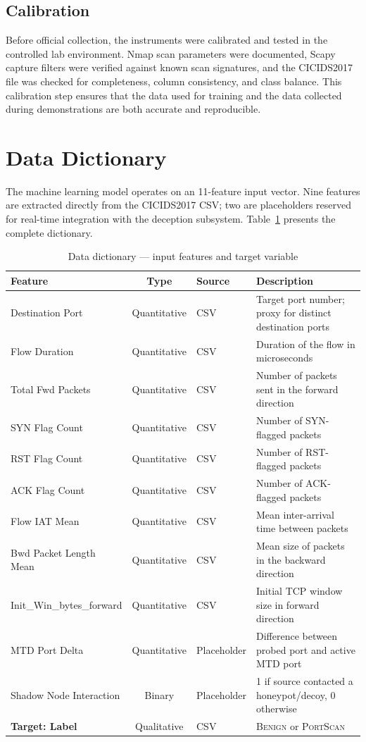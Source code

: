 \subsection{Calibration}

Before official collection, the instruments were calibrated and tested in the controlled lab environment. Nmap scan parameters were documented, Scapy capture filters were verified against known scan signatures, and the CICIDS2017 file was checked for completeness, column consistency, and class balance. This calibration step ensures that the data used for training and the data collected during demonstrations are both accurate and reproducible.

\section{Data Dictionary}\label{sec:data_dictionary}

The machine learning model operates on an 11-feature input vector. Nine features are extracted directly from the CICIDS2017 CSV; two are placeholders reserved for real-time integration with the deception subsystem. Table~\ref{tab:data_dict} presents the complete dictionary.

\begin{table}[H]
\centering
\caption{Data dictionary --- input features and target variable}
\label{tab:data_dict}
\begin{tabularx}{\textwidth}{lclX}
\toprule
\textbf{Feature} & \textbf{Type} & \textbf{Source} & \textbf{Description} \\
\midrule
Destination Port & Quantitative & CSV & Target port number; proxy for distinct destination ports \\
Flow Duration & Quantitative & CSV & Duration of the flow in microseconds \\
Total Fwd Packets & Quantitative & CSV & Number of packets sent in the forward direction \\
SYN Flag Count & Quantitative & CSV & Number of SYN-flagged packets \\
RST Flag Count & Quantitative & CSV & Number of RST-flagged packets \\
ACK Flag Count & Quantitative & CSV & Number of ACK-flagged packets \\
Flow IAT Mean & Quantitative & CSV & Mean inter-arrival time between packets \\
Bwd Packet Length Mean & Quantitative & CSV & Mean size of packets in the backward direction \\
Init\_Win\_bytes\_forward & Quantitative & CSV & Initial TCP window size in forward direction \\
MTD Port Delta & Quantitative & Placeholder & Difference between probed port and active MTD port \\
Shadow Node Interaction & Binary & Placeholder & 1 if source contacted a honeypot/decoy, 0 otherwise \\
\midrule
\textbf{Target: Label} & Qualitative & CSV & \textsc{Benign} or \textsc{PortScan} \\
\bottomrule
\end{tabularx}
\end{table}

